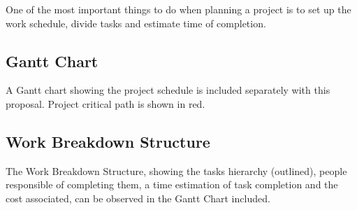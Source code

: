 One of the most important things to do when planning a project is to set up the work
schedule, divide tasks and estimate time of completion.

\subsection{Gantt Chart}
A Gantt chart showing the project schedule is included separately with this proposal. Project
critical path is shown in red.

\subsection{Work Breakdown Structure}
The Work Breakdown Structure, showing the tasks hierarchy (outlined), people responsible 
of completing them, a time estimation of task completion and 
the cost associated, can be observed in the Gantt Chart included.